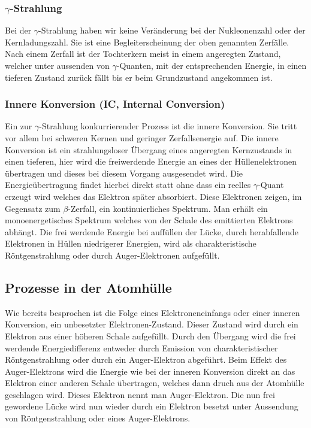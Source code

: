 \subsubsection{$\gamma$-Strahlung}
Bei der $\gamma$-Strahlung haben wir keine Veränderung bei der Nukleonenzahl oder der Kernladungszahl. Sie ist eine Begleiterscheinung der oben genannten Zerfälle. Nach einem Zerfall ist der Tochterkern meist in einem angeregten Zustand, welcher unter aussenden von $\gamma$-Quanten, mit der entsprechenden Energie, in einen tieferen Zustand zurück fällt bis er beim Grundzustand angekommen ist.
\subsubsection{Innere Konversion (IC, Internal Conversion)}
Ein zur $\gamma$-Strahlung konkurrierender Prozess ist die innere Konversion. Sie tritt vor allem bei schweren Kernen und geringer Zerfallsenergie auf. Die innere Konversion ist ein strahlungsloser Übergang eines angeregten Kernzustands in einen tieferen, hier wird die freiwerdende Energie an eines der Hüllenelektronen übertragen und dieses bei diesem Vorgang ausgesendet wird. Die Energieübertragung findet hierbei direkt statt ohne dass ein reelles $\gamma$-Quant erzeugt wird welches das Elektron später absorbiert. Diese Elektronen zeigen, im Gegensatz zum $\beta$-Zerfall, ein kontinuierliches Spektrum. Man erhält ein monoenergetisches Spektrum welches von der Schale des emittierten Elektrons abhängt. Die frei werdende Energie bei auffüllen der Lücke, durch herabfallende Elektronen in Hüllen niedrigerer Energien, wird als charakteristische Röntgenstrahlung oder durch Auger-Elektronen aufgefüllt.
\subsection{Prozesse in der Atomhülle}
Wie bereits besprochen ist die Folge eines Elektroneneinfangs oder einer inneren Konversion, ein unbesetzter Elektronen-Zustand. Dieser Zustand wird durch ein Elektron aus einer höheren Schale aufgefüllt. Durch den Übergang wird die frei werdende Energiedifferenz entweder durch Emission von charakteristischer Röntgenstrahlung oder durch ein Auger-Elektron abgeführt. Beim Effekt des Auger-Elektrons wird die Energie wie bei der inneren Konversion direkt an das Elektron einer anderen Schale übertragen, welches dann druch aus der Atomhülle geschlagen wird. Dieses Elektron nennt man Auger-Elektron. Die nun frei gewordene Lücke wird nun wieder durch ein Elektron besetzt unter Aussendung von Röntgenstrahlung oder eines Auger-Elektrons.
